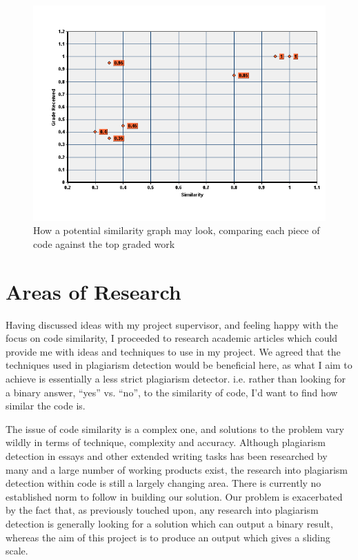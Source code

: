 \begin{figure}[ht!]
	\centering
		\includegraphics[width=\textwidth]{Figures/similarityVsGradeGraph}
	\caption{How a potential similarity graph may look, comparing each piece of
	code against the top graded work}
	\label{fig:SimilarityVsGradeGraph}
\end{figure}


\section{Areas of Research}

Having discussed ideas with my project supervisor, and feeling happy with the
focus on code similarity, I proceeded to research academic articles which could
provide me with ideas and techniques to use in my project. We agreed that the
techniques used in plagiarism detection would be beneficial here, as what I aim
to achieve is essentially a less strict plagiarism detector. i.e. rather than
looking for a binary answer, ``yes'' vs. ``no'', to the similarity of code, I'd
want to find how similar the code is.

The issue of code similarity is a complex one, and solutions to the problem
vary wildly in terms of technique, complexity and accuracy. Although plagiarism
detection in essays and other extended writing tasks has been 
researched by many and a large number of working products exist, the research
into plagiarism detection within code is still a largely changing area. There
is currently no established norm to follow in building our solution. Our problem
is exacerbated by the fact that, as previously touched upon,
any research into plagiarism detection is
generally looking for a solution which can output a binary result, whereas the
aim of this project is to produce an output which gives a sliding scale.

